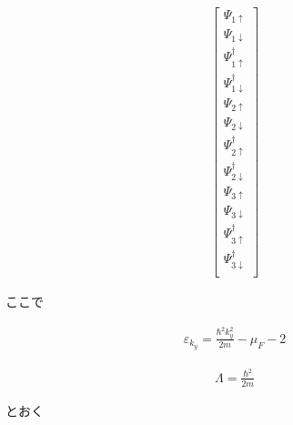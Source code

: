 \documentclass{jsarticle}
\begin{document}
\begin{align}
			\begin{bmatrix}
				\Psi_{1\uparrow} \\
				\Psi_{1\downarrow} \\
				\Psi_{1\uparrow}^\dagger \\
				\Psi_{1\downarrow}^\dagger \\
				\Psi_{2\uparrow} \\
				\Psi_{2\downarrow} \\
				\Psi_{2\uparrow}^\dagger \\
				\Psi_{2\downarrow}^\dagger \\
				\Psi_{3\uparrow} \\
				\Psi_{3\downarrow} \\
				\Psi_{3\uparrow}^\dagger \\
				\Psi_{3\downarrow}^\dagger \\
			\end{bmatrix}
		\end{align}

		ここで

		\begin{align}
			\varepsilon_{k_y}=\frac{\hbar^2k_y^2}{2m}-\mu_F-2
		\end{align}
		
		\begin{align}
			\varLambda=\frac{\hbar^2}{2m}
		\end{align}

		とおく
\end{document}
